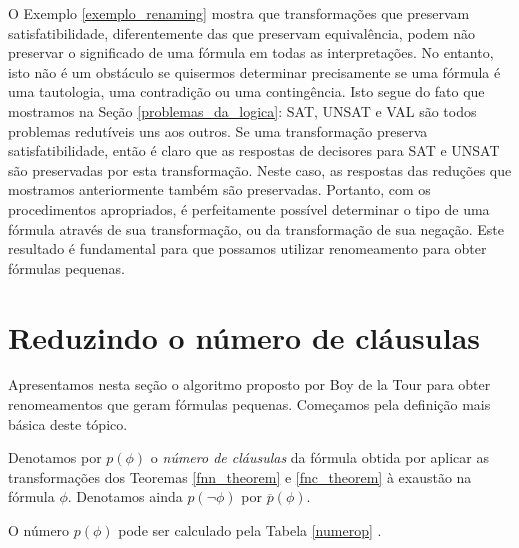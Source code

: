 O Exemplo \ref{exemplo_renaming} mostra que transformações que preservam satisfatibilidade, diferentemente das que preservam equivalência, podem não preservar o significado de uma fórmula em todas as interpretações. No entanto, isto não é um obstáculo se quisermos determinar precisamente se uma fórmula é uma tautologia, uma contradição ou uma contingência. Isto segue do fato que mostramos na Seção \ref{problemas_da_logica}: SAT, UNSAT e VAL são todos problemas redutíveis uns aos outros. Se uma transformação preserva satisfatibilidade, então é claro que as respostas de decisores para SAT e UNSAT são preservadas por esta transformação. Neste caso, as respostas das reduções que mostramos anteriormente também são preservadas. Portanto, com os procedimentos apropriados, é perfeitamente possível determinar o tipo de uma fórmula através de sua transformação, ou da transformação de sua negação. Este resultado é fundamental para que possamos utilizar renomeamento para obter fórmulas pequenas.

\section{Reduzindo o número de cláusulas}

\indent

Apresentamos nesta seção o algoritmo proposto por Boy de la Tour para obter renomeamentos que geram fórmulas pequenas. Começamos pela definição mais básica deste tópico.

\begin{definition}
	Denotamos por $p(\phi)$ o \emph{número de cláusulas} da fórmula obtida por aplicar as transformações dos Teoremas \ref{fnn_theorem} e \ref{fnc_theorem} à exaustão na fórmula $\phi$. Denotamos ainda $p(\neg \phi)$ por $\overline{p}(\phi)$.
\end{definition}

O número $p(\phi)$ pode ser calculado pela Tabela \ref{numerop} \cite{de1992optimality}.

